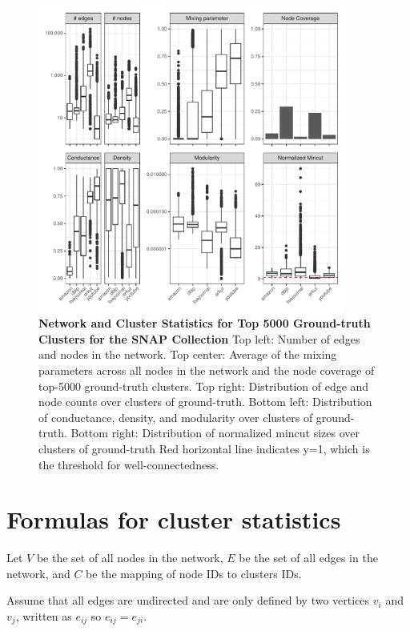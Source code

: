 \documentclass[aps,pre,superscriptaddress]{article}
\begin{document}
\begin{figure}[!htpb]
	\centering
	\includegraphics[width=0.9\textwidth]{figures/snap_groundtruth_top_5000_stats.pdf}
	\caption[]{\textbf{Network and Cluster Statistics for Top 5000 Ground-truth Clusters for the SNAP Collection} Top left: Number of edges and nodes in the network. Top center: Average of the mixing parameters across all nodes in the network and the node coverage of top-5000 ground-truth clusters. Top right: Distribution of edge and node counts over clusters of ground-truth. Bottom left: Distribution of conductance, density, and modularity over clusters of ground-truth. Bottom right: Distribution of normalized mincut sizes over clusters of ground-truth Red horizontal line indicates y=1, which is the threshold for well-connectedness.}
	\label{fig:XXX}
\end{figure}





\clearpage
\section{Formulas for cluster statistics}
Let $V$ be the set of all nodes in the network, $E$ be the set of all edges in the network, and $C$ be the mapping of node IDs to clusters IDs.

Assume that all edges are undirected and are only defined by two vertices $v_{i}$ and $v_{j}$, written as $e_{ij}$ so $e_{ij} = e_{ji}$.
\end{document}
